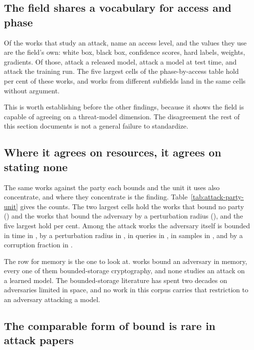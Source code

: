 \subsection{The field shares a vocabulary for access and phase}

Of the \NumAttackWorks{} works that study an attack, \AttackAccessNamed{} name an
access level, and the values they use are the field's own: white box, black box,
confidence scores, hard labels, weights, gradients. Of those, \AttackPostHoc{}
attack a released model, \AttackTestTime{} attack a model at test time, and
\AttackTrainTime{} attack the training run. The five largest cells of the
phase-by-access table hold \PhaseAccessTopFive{} per cent of these works, and works
from different subfields land in the same cells without argument.

This is worth establishing before the other findings, because it shows the field
is capable of agreeing on a threat-model dimension. The disagreement the rest of
this section documents is not a general failure to standardize.

\subsection{Where it agrees on resources, it agrees on stating none}

The same works against the party each bounds and the unit it uses also
concentrate, and where they concentrate is the finding.
Table~\ref{tab:attack-party-unit} gives the counts. The two largest cells hold the
works that bound no party (\AttackUnbound{}) and the works that bound the adversary
by a perturbation radius (\AttackPerturb{}), and the five largest hold
\PartyUnitTopFive{} per cent. Among the \NumAttackWorks{} attack works the adversary
itself is bounded in time in \AttackTimeAttacker{}, by a perturbation radius in
\AttackPerturb{}, in queries in \AttackQueriesAttacker{}, in samples in
\AttackSamplesAttacker{}, and by a corruption fraction in \AttackCorrupt{}.



The row for memory is the one to look at. \AttackerMemory{} works bound an
adversary in memory, every one of them bounded-storage cryptography, and none
studies an attack on a learned model. The bounded-storage literature has spent two
decades on adversaries limited in space, and no work in this corpus carries that
restriction to an adversary attacking a model.

\subsection{The comparable form of bound is rare in attack papers}

